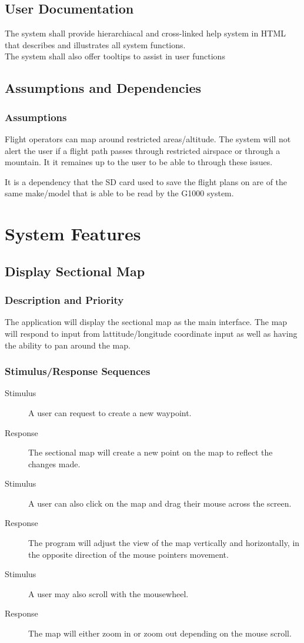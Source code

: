 \documentclass[12pt, letterpaper]{article}
\begin{document}
  \subsection{User Documentation}
      The system shall provide hierarchiacal and cross-linked help system in HTML that
              describes and illustrates all system functions.\\ 
      The system shall also offer tooltips to assist in user functions \\ 
  \subsection{Assumptions and Dependencies}
      \subsubsection{Assumptions}    
       Flight operators can map around restricted areas/altitude. 
       The system will not alert the user if a flight path passes through restricted airspace or through a mountain.
       It it remaines up to the user to be able to through these issues.

       It is a dependency that the SD card used to save the flight plans on are of the same make/model that
       is able to be read by the G1000 system.

    \newpage
\section{System Features}
  \subsection{Display Sectional Map}
    \subsubsection{Description and Priority}
      The application will display the sectional map as the main interface.
      The map will respond to input from lattitude/longitude coordinate input as well
      as having the ability to pan around the map.
    \subsubsection{Stimulus/Response Sequences}
      \begin{description}
        \item[Stimulus] A user can request to create a new waypoint.
		\item[Response]	The sectional map will create a new point on the map to
			reflect the changes made.
		\item[Stimulus] A user can also click on the map and drag their mouse
			across the screen.
    \item[Response] The program will adjust the view of the map vertically and horizontally,
			in the opposite direction of the mouse pointers movement.
		\item[Stimulus] A user may also scroll with the mousewheel.
		\item[Response] The map will either zoom in or zoom out depending on the mouse scroll.
      \end{description}
\end{document}
